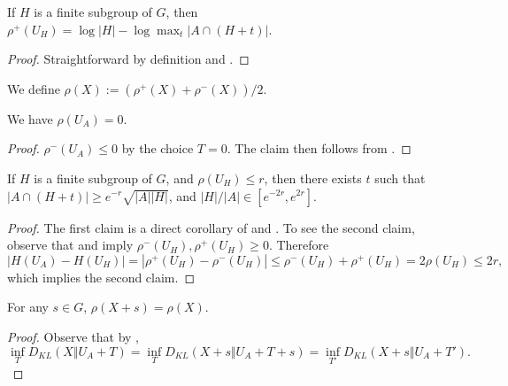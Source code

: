 \begin{corollary}\label{rhoplus-subgroup}\leanok If $H$ is a finite subgroup of $G$, then $\rho^+(U_H) = \log |H| - \log \max_t |A \cap (H+t)|$.
\end{corollary}

\begin{proof}\leanok {} Straightforward by definition and .
\end{proof}

\begin{definition}\label{rho-def}\leanok  We define $\rho(X) := (\rho^+(X) + \rho^-(X))/2$.
\end{definition}

\begin{lemma}\label{rho-init}\label{rho_of_uniform}\leanok  We have $\rho(U_A) = 0$.
\end{lemma}

\begin{proof}\leanok {} $\rho^-(U_A)\le 0$ by the choice $T=0$. The claim then follows from .
\end{proof}

\begin{lemma}\label{rho-subgroup}\leanok
If $H$ is a finite subgroup of $G$, and $\rho(U_H) \leq r$, then there exists
$t$ such that $|A \cap (H+t)| \geq e^{-r} \sqrt{|A||H|}$, and
$|H|/|A|\in[e^{-2r},e^{2r}]$.
\end{lemma}

\begin{proof}\leanok{} The first claim is a direct corollary of  and . To see the second claim, observe that  and  imply $\rho^-(U_H),\rho^+(U_H)\ge 0$. Therefore $$|H(U_A)-H(U_H)|=|\rho^+(U_H)-\rho^-(U_H)|\le \rho^-(U_H)+\rho^+(U_H)= 2\rho(U_H)\le 2r,$$
  which implies the second claim.
\end{proof}

\begin{lemma}\label{rho-invariant}\leanok{}  For any $s \in G$, $\rho(X+s) = \rho(X)$.
\end{lemma}

\begin{proof}\leanok{} Observe that by , $$\inf_T D_{KL}(X\Vert U_A+T)=\inf_T D_{KL}(X+s\Vert U_A+T+s)=\inf_{T'} D_{KL}(X+s\Vert U_A+T').$$
\end{proof}

